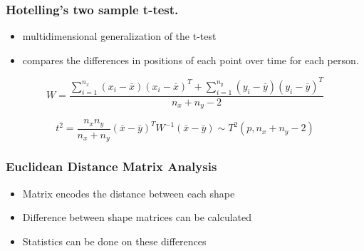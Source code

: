 \documentclass{beamer} %
\theoremstyle{definition} %
\begin{document}
\begin{frame}
\frametitle{Hotelling's two sample t-test. }

\begin{itemize}
\item multidimensional generalization of the t-test
\item compares the differences in positions of each point over time for each person.
\end{itemize}

$$ W = \frac{ \sum_{i=1}^{n_x} (x_i - \bar{x})( x_i - \bar{x})^T +  \sum_{i=1}^{n_y} (y_i - \bar{y})( y_i - \bar{y})^T}{ n_x + n_y - 2}$$

$$t^2 = \frac{n_x n_y}{n_x + n_y} (\bar{x} - \bar{y})^T W^{-1} (\bar{x} - \bar{y}) \sim T^2(p,n_x + n_y - 2)$$

\end{frame}

\begin{frame}
\frametitle{Euclidean Distance Matrix Analysis}

\begin{itemize}
\item Matrix encodes the distance between each shape
\item Difference between shape matrices can be calculated
\item Statistics can be done on these differences

\end{itemize}

\end{frame}
\end{document}
